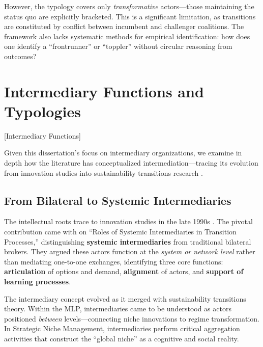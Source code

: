 \documentclass[../main.tex]{subfiles}
\begin{document}
However, the typology covers only \textit{transformative} actors---those maintaining the status quo are explicitly bracketed. This is a significant limitation, as transitions are constituted by conflict between incumbent and challenger coalitions. The framework also lacks systematic methods for empirical identification: how does one identify a ``frontrunner'' or ``toppler'' without circular reasoning from outcomes?


\section{Intermediary Functions and Typologies}[Intermediary Functions]

Given this dissertation's focus on intermediary organizations, we examine in depth how the literature has conceptualized intermediation---tracing its evolution from innovation studies into sustainability transitions research \cite{vanlente2020intermediaries}.

\subsection{From Bilateral to Systemic Intermediaries}

The intellectual roots trace to innovation studies in the late 1990s \cite{howells2006intermediation}. The pivotal contribution came with \textcite{vanlente2003systemic} on ``Roles of Systemic Intermediaries in Transition Processes,'' distinguishing \textbf{systemic intermediaries} from traditional bilateral brokers. They argued these actors function at the \emph{system or network level} rather than mediating one-to-one exchanges, identifying three core functions: \textbf{articulation} of options and demand, \textbf{alignment} of actors, and \textbf{support of learning processes}.

The intermediary concept evolved as it merged with sustainability transitions theory. Within the MLP, intermediaries came to be understood as actors positioned \emph{between} levels---connecting niche innovations to regime transformation. In Strategic Niche Management, intermediaries perform critical aggregation activities that construct the ``global niche'' as a cognitive and social reality.
\end{document}
